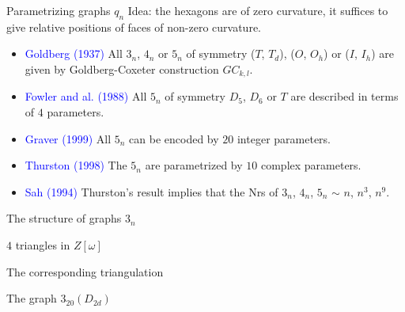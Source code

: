 \documentclass[%
pdf,
colorBG,
slideColor,
]{prosper}
\begin{document}
\begin{slide}{Parametrizing graphs $q_n$}
Idea: the hexagons are of zero curvature, it suffices to give relative positions of faces of non-zero curvature.
\begin{itemize}
\item \textcolor{blue}{Goldberg (1937)} All $3_n$, $4_n$ or $5_n$ of symmetry ($T$, $T_d$), ($O$, $O_h$) or ($I$, $I_h$) are given by Goldberg-Coxeter construction $GC_{k,l}$.
\item \textcolor{blue}{Fowler and al. (1988)} All $5_n$ of symmetry $D_5$, $D_6$ or $T$ are described in terms of $4$ parameters.
\item \textcolor{blue}{Graver (1999)} All $5_n$ can be encoded by $20$ integer parameters.
\item \textcolor{blue}{Thurston (1998)} The $5_n$ are parametrized by $10$ complex parameters.
\item \textcolor{blue}{Sah (1994)} Thurston's result implies that the Nrs of $3_n$, $4_n$, $5_n$ $\sim$ $n$, $n^3$, $n^9$.
\end{itemize}

\end{slide}




\begin{slide}{The structure of graphs $3_n$}

\vspace{-4mm}
\begin{center}
\begin{minipage}{5cm}
\par
$4$ triangles in $Z[\omega]$
\end{minipage}
\begin{minipage}{5cm}
\par
The corresponding triangulation
\end{minipage}
\end{center}

\begin{center}
\begin{minipage}{5cm}
\par
\end{minipage}
\begin{minipage}{5cm}
The graph $3_{20}(D_{2d})$
\end{minipage}
\end{center}

\end{slide}
\end{document}
